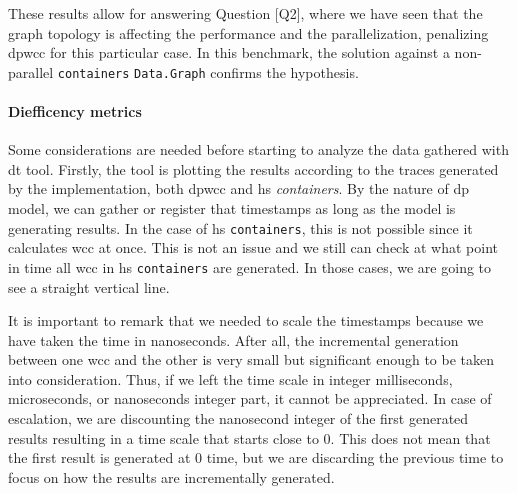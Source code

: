 \begin{table}[H]
  \centering
 \caption[{[PoC] Mean Execution times}]{Mean execution time of each network running under \texttt{criterion} library comparing both implementations in \acrshort{hs}: \acrshort{dpwcc} and \texttt{containers} lib. \texttt{criterion} runs $1000$ times each implementations and takes mean execution times of each. \texttt{Speed-up} column shows the ratio between \texttt{Haskell containers} and \texttt{\acrshort{dpwcc}}}
 \label{table:6}
 \end{table}

These results allow for answering Question [Q2], where we have seen that the graph topology is affecting the performance and the parallelization, penalizing \acrfull{dpwcc} for this particular case. In this benchmark, 
the solution against a non-parallel \texttt{containers} \texttt{Data.Graph} confirms the hypothesis. 

\paragraph{Diefficency metrics} Some considerations are needed before starting to analyze the data gathered with \acrfull{dt} tool. Firstly, the tool is plotting the results according to the traces generated by the implementation, 
both \acrshort{dpwcc} and \acrshort{hs} \emph{containers}. By the nature of \acrshort{dp} model, we can gather or register that timestamps as long as the model is generating results. In the case of \acrshort{hs} \texttt{containers}, this is not possible since it 
calculates \acrshort{wcc} at once. This is not an issue and we still can check at what point in time all \acrshort{wcc} in \acrshort{hs} \texttt{containers} are generated. In those cases, we are going to see a straight vertical line. 

It is important to remark that we needed to scale the timestamps because we have taken the time in nanoseconds. After all, the incremental generation between one \acrshort{wcc} and the other is very small but significant enough to be taken into consideration. 
Thus, if we left the time scale in integer milliseconds, microseconds, or nanoseconds integer part, it cannot be appreciated. In case of escalation, we are discounting the nanosecond integer of the first generated results resulting in a time scale that starts close to $0$. 
This does not mean that the first result is generated at $0$ time, but we are discarding the previous time to focus on how the results are incrementally generated.

